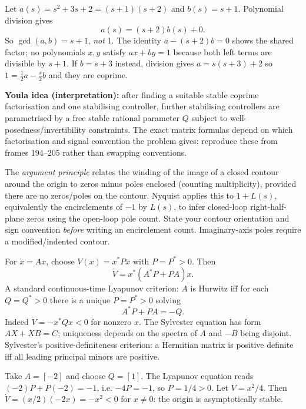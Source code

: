 \documentclass[10pt,a4paper]{article}
\begin{document}
\begin{workbox}[title={WORKED: Euclidean algorithm and Bezout}]
Let $a(s)=s^2+3s+2=(s+1)(s+2)$ and $b(s)=s+1$. Polynomial division gives
\[a(s)=(s+2)b(s)+0.\]
So $\gcd(a,b)=s+1$, \emph{not} 1. The identity $a-(s+2)b=0$ shows the shared factor; no polynomials $x,y$ satisfy $ax+by=1$ because both left terms are divisible by $s+1$. If $b=s+3$ instead, division gives $a=s(s+3)+2$ so $1=\frac12a-\frac s2 b$ and they are coprime.
\end{workbox}
\begin{formbox}\textbf{Youla idea (interpretation):} after finding a suitable stable coprime factorisation and one stabilising controller, further stabilising controllers are parametrised by a free stable rational parameter $Q$ subject to well-posedness/invertibility constraints. The exact matrix formulas depend on which factorisation and signal convention the problem gives: reproduce these from frames 194--205 rather than swapping conventions.\end{formbox}
\begin{formbox}[title={NYQUIST PRINCIPLE: WHAT YOU MUST STATE}]
The \emph{argument principle} relates the winding of the image of a closed contour around the origin to zeros minus poles enclosed (counting multiplicity), provided there are no zeros/poles on the contour. Nyquist applies this to $1+L(s)$, equivalently the encirclements of $-1$ by $L(s)$, to infer closed-loop right-half-plane zeros using the open-loop pole count. State your contour orientation and sign convention \emph{before} writing an encirclement count. Imaginary-axis poles require a modified/indented contour.
\end{formbox}
\begin{formbox}[title={LYAPUNOV AND SYLVESTER EQUATIONS}]
For $\dot x=Ax$, choose $V(x)=x^*Px$ with $P=P^*>0$. Then
\[\dot V=x^*(A^*P+PA)x.\]
A standard continuous-time Lyapunov criterion: $A$ is Hurwitz iff for each $Q=Q^*>0$ there is a unique $P=P^*>0$ solving
\[\boxed{A^*P+PA=-Q.}\]
Indeed $\dot V=-x^*Qx<0$ for nonzero $x$. The Sylvester equation has form $AX+XB=C$; uniqueness depends on the spectra of $A$ and $-B$ being disjoint. Sylvester's positive-definiteness criterion: a Hermitian matrix is positive definite iff all leading principal minors are positive.
\end{formbox}
\begin{workbox}[title={WORKED: one-dimensional Lyapunov proof}]
Take $A=[-2]$ and choose $Q=[1]$. The Lyapunov equation reads $(-2)P+P(-2)=-1$, i.e. $-4P=-1$, so $\boxed{P=1/4>0}$. Let $V=x^2/4$. Then $\dot V=(x/2)(-2x)=-x^2<0$ for $x\ne0$: the origin is asymptotically stable.
\end{workbox}
\end{document}
